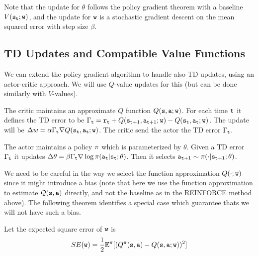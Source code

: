 Note that the update for $\theta$ follows the policy gradient theorem with a baseline $V({\tt s}_{\tt t};{\tt w})$, and the update for ${\tt w}$ is a stochastic gradient descent on the mean squared error with step size $\beta$.



\subsection{TD Updates and Compatible Value Functions}
We can extend the policy gradient algorithm to handle also TD updates, using an
actor-critic approach. We will use $Q$-value updates for this
(but can be done similarly with $V$-values).

The critic maintains an approximate $Q$ function $Q({\tt s},{\tt a};{\tt w})$. For each time ${\tt t}$ it defines the TD error to be $\Gamma_{\tt t} = {\tt r}_{\tt t} +Q({\tt s}_{{\tt t}+1},{\tt a}_{{\tt t}+1};{\tt w})-Q({\tt s}_{\tt t},{\tt a}_{\tt t};{\tt w})$. The update will be $\Delta w=\alpha\Gamma_{\tt t} \nabla Q({\tt s}_{\tt t},{\tt a}_{\tt t};{\tt w})$. The critic send the actor the TD error $\Gamma_{\tt t}$.

The actor maintains a policy $\pi$ which is parameterized by $\theta$. Given a TD error $\Gamma_{\tt t}$ it updates $\Delta \theta= \beta \Gamma_{\tt t} \nabla \log \pi({\tt a}_{\tt t}|{\tt s}_{\tt t};\theta)$. Then it selects ${\tt a}_{{\tt t}+1}\sim \pi(\cdot|{\tt s}_{{\tt t}+1};\theta)$.

We need to be careful in the way we select the function
approximation $Q(\cdot;{\tt w})$ since it might introduce a bias (note that here we use the function approximation to estimate $\mathcal{Q}({\tt s},{\tt a})$ directly, and not the baseline as in the REINFORCE method above).
The following theorem identifies a special case which guarantee
thats we will not have such a bias.

Let the expected square error of ${\tt w}$ is
\[
SE({\tt w})=\frac{1}{2}\mathbb{E}^\pi[(Q^\pi({\tt s},{\tt a})-Q({\tt s},{\tt a};{\tt w}))^2]
\]

